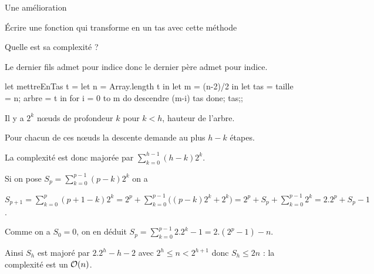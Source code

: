 \begin{center}
\quad
{}
\end{center}
\begin{exo}{Une amélioration}{}

Écrire une fonction qui transforme  en un tas avec cette méthode

Quelle est sa complexité ?
\reponse

Le dernier fils admet  pour indice donc le dernier père admet  pour indice.
\begin{ocaml}
let mettreEnTas t =
  let n = Array.length t in
  let m = (n-2)/2 in
  let tas = {taille = n; arbre = t} in
  for i = 0 to m do descendre (m-i) tas done;
  tas;;
\end{ocaml}
Il y a $2^k$ nœuds de profondeur $k$ pour $k < h$, hauteur de l'arbre.

Pour chacun de ces nœuds la descente demande au plus $h-k$ étapes.

La complexité est donc majorée par $\displaystyle \sum_{k=0}^{h-1} (h-k)2^k$.

Si on pose $\displaystyle S_p = \sum_{k=0}^{p-1} (p-k)2^k$ on a

$\displaystyle S_{p+1} = \sum_{k=0}^{p} (p+1-k)2^k
=2^p + \sum_{k=0}^{p-1} \bigl((p-k)2^k +2^k\bigr)
=2^p + S_p + \sum_{k=0}^{p-1}2^k = 2.2^p+S_p -1$.

Comme on a $S_0=0$, on en déduit $\displaystyle S_p = \sum_{k=0}^{p-1} 2.2^k -1 = 2.(2^p-1)-n$.

Ainsi $S_h$ est majoré par $2.2^h - h - 2$ avec $2^h \le n < 2^{h+1}$ donc $S_h\le 2n$ : la complexité est un ${\cal O}(n)$.
\end{exo}
